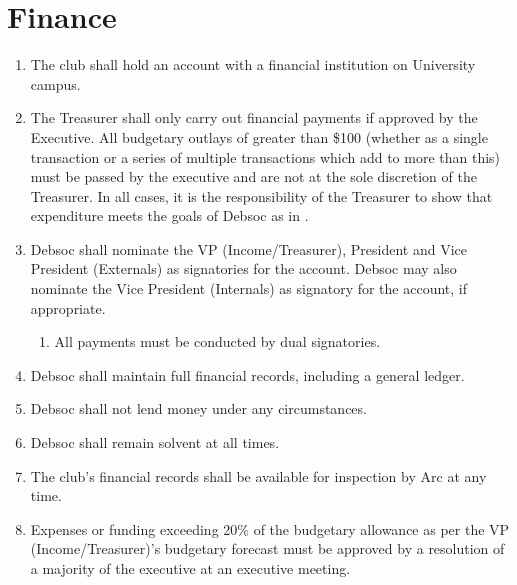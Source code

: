 \newpage
\section{Finance} \label{finances_section}

\begin{enumerate}
\item The club shall hold an account with a financial institution on University campus.
\item The Treasurer shall only carry out financial payments if approved by the Executive. All budgetary outlays of greater than \$100 (whether as a single transaction or a series of multiple transactions which add to more than this) must be passed by the executive and are not at the sole discretion of the Treasurer. In all cases, it is the responsibility of the Treasurer to show that expenditure meets the goals of Debsoc as in .
\item Debsoc shall nominate the VP (Income/Treasurer), President and Vice President (Externals) as signatories for the account. Debsoc may also nominate the Vice President (Internals) as signatory for the account, if appropriate.
\begin{enumerate}
    \item All payments must be conducted by dual signatories.
\end{enumerate}
\item Debsoc shall maintain full financial records, including a general ledger.
\item Debsoc shall not lend money under any circumstances.
\item Debsoc shall remain solvent at all times.
\item The club’s financial records shall be available for inspection by Arc at any time.
\item Expenses or funding exceeding 20\% of the budgetary allowance as per the VP (Income/Treasurer)’s budgetary forecast must be approved by a resolution of a majority of the executive at an executive meeting.
\end{enumerate}
